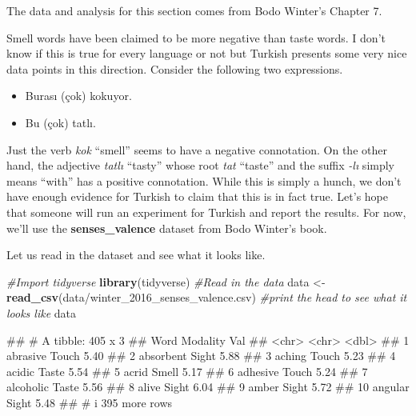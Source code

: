 \documentclass[
]{book}
\newenvironment{Shaded}{\begin{snugshade}}{\end{snugshade}}
\newcommand{\CommentTok}[1]{\textcolor[rgb]{0.56,0.35,0.01}{\textit{#1}}}
\newcommand{\FunctionTok}[1]{\textcolor[rgb]{0.13,0.29,0.53}{\textbf{#1}}}
\newcommand{\NormalTok}[1]{#1}
\newcommand{\OtherTok}[1]{\textcolor[rgb]{0.56,0.35,0.01}{#1}}
\newcommand{\StringTok}[1]{\textcolor[rgb]{0.31,0.60,0.02}{#1}}
\providecommand{\tightlist}{%
  \setlength{\itemsep}{0pt}\setlength{\parskip}{0pt}}
\begin{document}
The data and analysis for this section comes from Bodo Winter's Chapter 7.

Smell words have been claimed to be more negative than taste words. I don't know if this is true for every language or not but Turkish presents some very nice data points in this direction. Consider the following two expressions.

\begin{itemize}
\tightlist
\item
  Burası (çok) kokuyor.
\item
  Bu (çok) tatlı.
\end{itemize}

Just the verb \emph{kok} ``smell'' seems to have a negative connotation. On the other hand, the adjective \emph{tatlı} ``tasty'' whose root \emph{tat} ``taste'' and the suffix \emph{-lı} simply means ``with'' has a positive connotation. While this is simply a hunch, we don't have enough evidence for Turkish to claim that this is in fact true. Let's hope that someone will run an experiment for Turkish and report the results. For now, we'll use the \textbf{senses\_valence} dataset from Bodo Winter's book.

Let us read in the dataset and see what it looks like.

\begin{Shaded}
\begin{Highlighting}[]
\CommentTok{\#Import tidyverse}
\FunctionTok{library}\NormalTok{(tidyverse)}
\CommentTok{\#Read in the data}
\NormalTok{data }\OtherTok{\textless{}{-}} \FunctionTok{read\_csv}\NormalTok{(}\StringTok{\textquotesingle{}data/winter\_2016\_senses\_valence.csv\textquotesingle{}}\NormalTok{)}
\CommentTok{\#print the head to see what it looks like}
\NormalTok{data}
\end{Highlighting}
\end{Shaded}

\begin{Shaded}
\begin{Highlighting}[]
\NormalTok{\#\# \# A tibble: 405 x 3}
\NormalTok{\#\#    Word      Modality   Val}
\NormalTok{\#\#    \textless{}chr\textgreater{}     \textless{}chr\textgreater{}    \textless{}dbl\textgreater{}}
\NormalTok{\#\#  1 abrasive  Touch     5.40}
\NormalTok{\#\#  2 absorbent Sight     5.88}
\NormalTok{\#\#  3 aching    Touch     5.23}
\NormalTok{\#\#  4 acidic    Taste     5.54}
\NormalTok{\#\#  5 acrid     Smell     5.17}
\NormalTok{\#\#  6 adhesive  Touch     5.24}
\NormalTok{\#\#  7 alcoholic Taste     5.56}
\NormalTok{\#\#  8 alive     Sight     6.04}
\NormalTok{\#\#  9 amber     Sight     5.72}
\NormalTok{\#\# 10 angular   Sight     5.48}
\NormalTok{\#\# \# i 395 more rows}
\end{Highlighting}
\end{Shaded}
\end{document}
